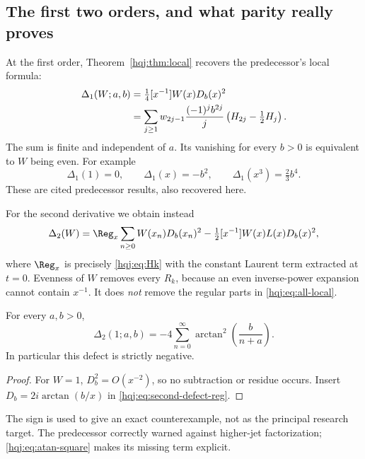\subsection{The first two orders, and what parity really proves}
At the first order, Theorem~\ref{hqj:thm:local} recovers the predecessor's
local formula:
\begin{align}
\Delta_1(W;a,b)
&=\tfrac14[x^{-1}]W(x)D_b(x)^2\notag\\
&=\sum_{j\ge1}w_{2j-1}\frac{(-1)^j b^{2j}}j
\left(H_{2j}-\tfrac12H_j\right).
\label{hqj:eq:first-defect}
\end{align}
The sum is finite and independent of $a$. Its vanishing for every $b>0$
is equivalent to $W$ being even. For example
\[
\Delta_1(1)=0,\qquad \Delta_1(x)=-b^2,\qquad
\Delta_1(x^3)=\tfrac23b^4.
\]
These are cited predecessor results, also recovered here.

For the second derivative we obtain instead
\begin{equation}\label{hqj:eq:second-defect-reg}
\Delta_2(W)=\Reg_x\sum_{n\ge0}W(x_n)D_b(x_n)^2
-\tfrac12[x^{-1}]W(x)L(x)D_b(x)^2,
\end{equation}
where $\Reg_x$ is precisely \eqref{hqj:eq:Hk} with the constant Laurent
term extracted at $t=0$. Evenness of $W$ removes every $R_k$, because
an even inverse-power expansion cannot contain $x^{-1}$. It does
\emph{not} remove the regular parts in \eqref{hqj:eq:all-local}.

\begin{corollary}\label{hqj:cor:atan}
For every $a,b>0$,
\begin{equation}\label{hqj:eq:atan-square}
\boxed{\Delta_2(1;a,b)=-4\sum_{n=0}^{\infty}
\arctan^2\!\left(\frac{b}{n+a}\right).}
\end{equation}
In particular this defect is strictly negative.
\end{corollary}
\begin{proof}
For $W=1$, $D_b^2=O(x^{-2})$, so no subtraction or residue occurs.
Insert $D_b=2i\arctan(b/x)$ in \eqref{hqj:eq:second-defect-reg}.
\end{proof}
The sign is used to give an exact counterexample, not as the principal
research target. The predecessor correctly warned against higher-jet
factorization; \eqref{hqj:eq:atan-square} makes its missing term explicit.

